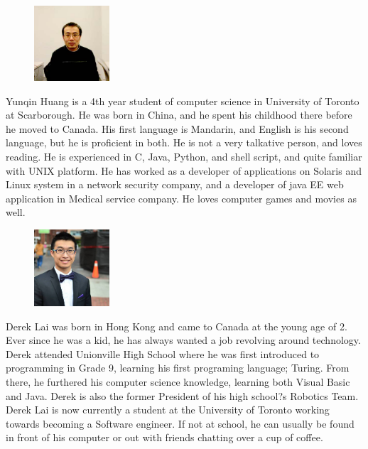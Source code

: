 \documentclass[pdftex,10pt,a4paper]{report}
\begin{document}
\begin{figure}
  \vspace{-20pt}
  \begin{center}
    \includegraphics[width=0.25\textwidth]{img/group/kevin}
  \end{center}
  \vspace{-20pt}
\end{figure}
Yunqin Huang is a 4th year student of computer science in University of Toronto at Scarborough. He was born in China, and he spent his childhood there before he moved to Canada. His first language is Mandarin, and English is his second language, but he is proficient in both. He is not a very talkative person, and loves reading. He is experienced in C, Java, Python, and shell script, and quite familiar with UNIX platform. He has worked as a developer of applications on Solaris and Linux system in a network security company, and a developer of java EE web application in Medical service company.
He loves computer games and movies as well. \\

\begin{figure}
  \vspace{-20pt}
  \begin{center}
    \includegraphics[width=0.25\textwidth]{img/group/derek}
  \end{center}
  \vspace{-20pt}
\end{figure}
Derek Lai was born in Hong Kong and came to Canada at the young age of 2. Ever since he was a kid, he has always wanted a job revolving around technology. Derek attended Unionville High School where he was first introduced to programming in Grade 9, learning his first programing language; Turing. From there, he furthered his computer science knowledge, learning both Visual Basic and Java. Derek is also the former President of his high school?s Robotics Team. Derek Lai is now currently a student at the University of Toronto working towards becoming a Software engineer. If not at school, he can usually be found in front of his computer or out with friends chatting over a cup of coffee.\\
\end{document}
